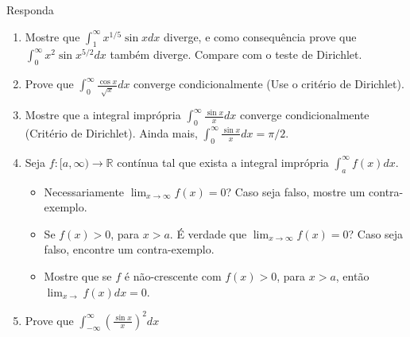 \documentclass{article}
\theoremstyle{plain}
\theoremstyle{definition}
\theoremstyle{remark}
\begin{document}
  Responda
  \begin{enumerate}
  \item Mostre que $\int_{1}^{\infty} x^{1/5}\sin x dx$ diverge, e como consequência prove que 
  $\int_{0}^{\infty} x^{2}\sin{x^{5/2}}dx$ também diverge. Compare com o teste de Dirichlet. 
  \item Prove que $\int_{0}^{\infty} \frac{\cos x}{\sqrt{x}}dx$ converge condicionalmente (Use o critério de Dirichlet).
  \item Mostre que a integral imprópria $\int_{0}^{\infty} \frac{\sin x}{x}dx$ converge condicionalmente (Critério de Dirichlet). Ainda mais, $\int_{0}^{\infty} \frac{\sin x}{x}dx=\pi/2$.
  \item Seja $f:[a,\infty)\rightarrow \mathbb{R}$ contínua tal que exista a integral imprópria $\int_{a}^{\infty} f(x)dx$. 
  \begin{itemize}
  \item Necessariamente  $\lim_{x\rightarrow \infty}f(x)=0$? Caso seja falso, mostre um contra-exemplo.
  \item Se $f(x)>0$, para $x>a$. É verdade que 
  $\lim_{x\rightarrow \infty} f(x)=0$?
  Caso seja falso, encontre um contra-exemplo.
  \item Mostre que se $f$ é não-crescente com $f(x)>0$, para $x>a$, então 
  $\lim_{x\rightarrow}f(x)dx=0$. 
  \end{itemize}
  \item Prove que $\int_{-\infty}^{\infty} (\frac{\sin x}{x})^{2}dx$
  \end{enumerate}
\end{document}

